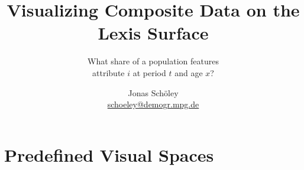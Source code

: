 \documentclass{beamer}
\title{Visualizing Composite Data on the Lexis Surface}
\subtitle{What share of a population features\\attribute $i$ at period $t$ and age $x$?}
\author{Jonas Schöley\\\url{schoeley@demogr.mpg.de}}
\begin{document}

{
  \begin{frame}[plain]
    \titlepage
  \end{frame}
}


\section{Predefined Visual Spaces} %
\end{document}
